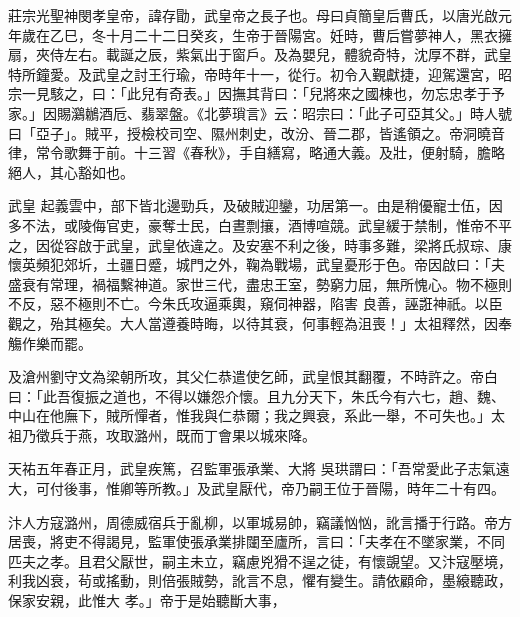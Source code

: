 
\begin{pinyinscope}

 莊宗光聖神閔孝皇帝，諱存勖，武皇帝之長子也。母曰貞簡皇后曹氏，以唐光啟元年歲在乙巳，冬十月二十二日癸亥，生帝于晉陽宮。妊時，曹后嘗夢神人，黑衣擁
 扇，夾侍左右。載誕之辰，紫氣出于窗戶。及為嬰兒，體貌奇特，沈厚不群，武皇特所鐘愛。及武皇之討王行瑜，帝時年十一，從行。初令入覲獻捷，迎駕還宮，昭宗一見駭之，曰：「此兒有奇表。」因撫其背曰：「兒將來之國棟也，勿忘忠孝于予家。」因賜鸂鶒酒卮、翡翠盤。《北夢瑣言》云：昭宗曰：「此子可亞其父。」時人號曰「亞子」。賊平，授檢校司空、隰州刺史，改汾、晉二郡，皆遙領之。帝洞曉音律，常令歌舞于前。十三習《春秋》，手自繕寫，略通大義。及壯，便射騎，膽略絕人，其心豁如也。



 武皇
 起義雲中，部下皆北邊勁兵，及破賊迎鑾，功居第一。由是稍優寵士伍，因多不法，或陵侮官吏，豪奪士民，白晝剽攘，酒博喧競。武皇緩于禁制，惟帝不平之，因從容啟于武皇，武皇依違之。及安塞不利之後，時事多難，梁將氏叔琮、康懷英頻犯郊圻，土疆日蹙，城門之外，鞠為戰場，武皇憂形于色。帝因啟曰：「夫盛衰有常理，禍福繫神道。家世三代，盡忠王室，勢窮力屈，無所愧心。物不極則不反，惡不極則不亡。今朱氏攻逼乘輿，窺伺神器，陷害
 良善，誣誑神祇。以臣觀之，殆其極矣。大人當遵養時晦，以待其衰，何事輕為沮喪！」太祖釋然，因奉觴作樂而罷。



 及滄州劉守文為梁朝所攻，其父仁恭遣使乞師，武皇恨其翻覆，不時許之。帝白曰：「此吾復振之道也，不得以嫌怨介懷。且九分天下，朱氏今有六七，趙、魏、中山在他廡下，賊所憚者，惟我與仁恭爾；我之興衰，系此一舉，不可失也。」太祖乃徵兵于燕，攻取潞州，既而丁會果以城來降。



 天祐五年春正月，武皇疾篤，召監軍張承業、大將
 吳珙謂曰：「吾常愛此子志氣遠大，可付後事，惟卿等所教。」及武皇厭代，帝乃嗣王位于晉陽，時年二十有四。



 汴人方寇潞州，周德威宿兵于亂柳，以軍城易帥，竊議忷忷，訛言播于行路。帝方居喪，將吏不得謁見，監軍使張承業排闥至廬所，言曰：「夫孝在不墜家業，不同匹夫之孝。且君父厭世，嗣主未立，竊慮兇猾不逞之徒，有懷覬望。又汴寇壓境，利我凶衰，茍或搖動，則倍張賊勢，訛言不息，懼有變生。請依顧命，墨縗聽政，保家安親，此惟大
 孝。」帝于是始聽斷大事，




\end{pinyinscope}
